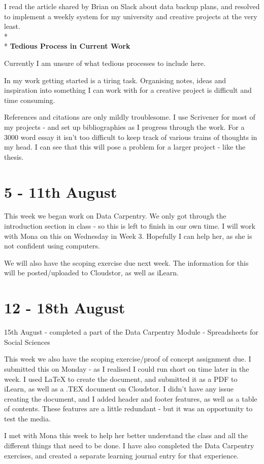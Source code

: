 \documentclass{article}
\begin{document}
I read the article shared by Brian on Slack about data backup plans, and resolved to implement a weekly system for my university and creative projects at the very least. 
\\*
\\*
\noindent \textbf{Tedious Process in Current Work}

Currently I am unsure of what tedious processes to include here.

In my work getting started is a tiring task. Organising notes, ideas and inspiration into something I can work with for a creative project is difficult and time consuming.

References and citations are only mildly troublesome. I use Scrivener for most of my projects - and set up bibliographies as I progress through the work. For a 3000 word essay it isn't too difficult to keep track of various trains of thoughts in my head. I can see that this will pose a problem for a larger project - like the thesis.

\section{5 - 11th August}
This week we began work on Data Carpentry. We only got through the introduction section in class - so this is left to finish in our own time. I will work with Mona on this on Wednesday in Week 3. Hopefully I can help her, as she is not confident using computers. 

We will also have the scoping exercise due next week. The information for this will be posted/uploaded to Cloudstor, as well as iLearn.

\section{12 - 18th August}
15th August - completed a part of the Data Carpentry Module - Spreadsheets for Social Sciences

This week we also have the scoping exercise/proof of concept assignment due. I submitted this on Monday - as I realised I could run short on time later in the week. 
I used LaTeX to create the document, and submitted it as a PDF to iLearn, as well as a .TEX document on Cloudstor. 
I didn't have any issue creating the document, and I added header and footer features, as well as a table of contents. These features are a little redundant - but it was an opportunity  to test the media. 

I met with Mona this week to help her better understand the class and all the different things that need to be done. I have also completed the Data Carpentry exercises, and created a separate learning journal entry for that experience. 
\end{document}
